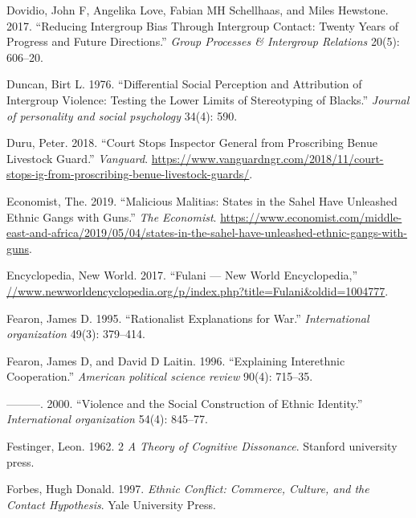 \documentclass[11pt]{article}
\begin{document}
\leavevmode\hypertarget{ref-dovidio2017reducing}{}%
Dovidio, John F, Angelika Love, Fabian MH Schellhaas, and Miles
Hewstone. 2017. ``Reducing Intergroup Bias Through Intergroup Contact:
Twenty Years of Progress and Future Directions.'' \emph{Group Processes
\& Intergroup Relations} 20(5): 606--20.

\leavevmode\hypertarget{ref-duncan1976differential}{}%
Duncan, Birt L. 1976. ``Differential Social Perception and Attribution
of Intergroup Violence: Testing the Lower Limits of Stereotyping of
Blacks.'' \emph{Journal of personality and social psychology} 34(4):
590.

\leavevmode\hypertarget{ref-duru2018court}{}%
Duru, Peter. 2018. ``Court Stops Inspector General from Proscribing
Benue Livestock Guard.'' \emph{Vanguard}.
\url{https://www.vanguardngr.com/2018/11/court-stops-ig-from-proscribing-benue-livestock-guards/}.

\leavevmode\hypertarget{ref-economist2019militias}{}%
Economist, The. 2019. ``Malicious Malitias: States in the Sahel Have
Unleashed Ethnic Gangs with Guns.'' \emph{The Economist}.
\url{https://www.economist.com/middle-east-and-africa/2019/05/04/states-in-the-sahel-have-unleashed-ethnic-gangs-with-guns}.

\leavevmode\hypertarget{ref-fulanisize2017}{}%
Encyclopedia, New World. 2017. ``Fulani --- New World Encyclopedia,''
\url{//www.newworldencyclopedia.org/p/index.php?title=Fulani\&oldid=1004777}.

\leavevmode\hypertarget{ref-fearon1995rationalist}{}%
Fearon, James D. 1995. ``Rationalist Explanations for War.''
\emph{International organization} 49(3): 379--414.

\leavevmode\hypertarget{ref-fearon1996explaining}{}%
Fearon, James D, and David D Laitin. 1996. ``Explaining Interethnic
Cooperation.'' \emph{American political science review} 90(4): 715--35.

\leavevmode\hypertarget{ref-fearon2000violence}{}%
---------. 2000. ``Violence and the Social Construction of Ethnic
Identity.'' \emph{International organization} 54(4): 845--77.

\leavevmode\hypertarget{ref-festinger1962cognitiveDissonance}{}%
Festinger, Leon. 1962. 2 \emph{A Theory of Cognitive Dissonance}.
Stanford university press.

\leavevmode\hypertarget{ref-forbes1997ethnic}{}%
Forbes, Hugh Donald. 1997. \emph{Ethnic Conflict: Commerce, Culture, and
the Contact Hypothesis}. Yale University Press.
\end{document}
